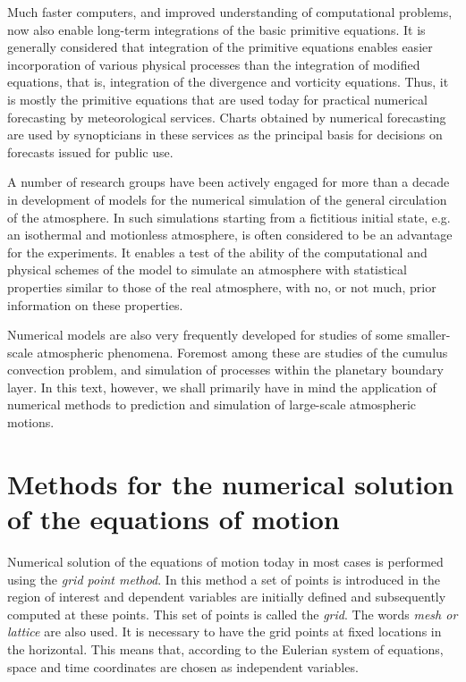 Much faster computers, and improved understanding of computational
problems, now also enable long-term integrations of the basic primitive
equations. It is generally considered that integration of the primitive
equations enables easier incorporation of various physical processes
than the integration of modified equations, that is, integration of the
divergence and vorticity equations. Thus, it is mostly the primitive
equations that are used today for practical numerical forecasting by
meteorological services. Charts obtained by numerical forecasting are
used by synopticians in these services as the principal basis for
decisions on forecasts issued for public use.

A number of research groups have been actively engaged for more than a
decade in development of models for the numerical simulation of the
general circulation of the atmosphere. In such simulations starting from
a fictitious initial state, e.g. an isothermal and motionless
atmosphere, is often considered to be an advantage for the experiments.
It enables a test of the ability of the computational and physical
schemes of the model to simulate an atmosphere with statistical
properties similar to those of the real atmosphere, with no, or not
much, prior information on these properties.

Numerical models are also very frequently developed for studies of some
smaller-scale atmospheric phenomena. Foremost among these are studies of
the cumulus convection problem, and simulation of processes within the
planetary boundary layer. In this text, however, we shall primarily have
in mind the application of numerical methods to prediction and
simulation of large-scale atmospheric motions.

\section{Methods for the numerical solution
of the equations of
motion}\label{methods-for-the-numerical-solution-of-the-equations-of-motion}

Numerical solution of the equations of motion today in most cases is
performed using the \emph{grid point method}. In this method a set of
points is introduced in the region of interest and dependent variables
are initially defined and subsequently computed at these points. This
set of points is called the \emph{grid}. The words \emph{mesh or
lattice} are also used. It is necessary to have the grid points at fixed
locations in the horizontal. This means that, according to the Eulerian
system of equations, space and time coordinates are chosen as
independent variables.

